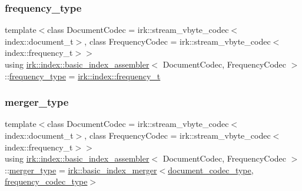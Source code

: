\mbox{\label{classirk_1_1index_1_1basic__index__assembler_a5e340ecba42926be7121502bdcaec26e}} 
\subsubsection{\texorpdfstring{frequency\+\_\+type}{frequency\_type}}
{\footnotesize\ttfamily template$<$class Document\+Codec  = irk\+::stream\+\_\+vbyte\+\_\+codec$<$index\+::document\+\_\+t$>$, class Frequency\+Codec  = irk\+::stream\+\_\+vbyte\+\_\+codec$<$index\+::frequency\+\_\+t$>$$>$ \\
using \mbox{\hyperlink{classirk_1_1index_1_1basic__index__assembler}{irk\+::index\+::basic\+\_\+index\+\_\+assembler}}$<$ Document\+Codec, Frequency\+Codec $>$\+::\mbox{\hyperlink{classirk_1_1index_1_1basic__index__assembler_a5e340ecba42926be7121502bdcaec26e}{frequency\+\_\+type}} =  \mbox{\hyperlink{namespaceirk_1_1index_aa2cb48e79abd95deb25bbdf36c0ea70f}{irk\+::index\+::frequency\+\_\+t}}}

\mbox{\label{classirk_1_1index_1_1basic__index__assembler_ade53519f2f70e2c1d66a2451a76259b0}} 
\subsubsection{\texorpdfstring{merger\+\_\+type}{merger\_type}}
{\footnotesize\ttfamily template$<$class Document\+Codec  = irk\+::stream\+\_\+vbyte\+\_\+codec$<$index\+::document\+\_\+t$>$, class Frequency\+Codec  = irk\+::stream\+\_\+vbyte\+\_\+codec$<$index\+::frequency\+\_\+t$>$$>$ \\
using \mbox{\hyperlink{classirk_1_1index_1_1basic__index__assembler}{irk\+::index\+::basic\+\_\+index\+\_\+assembler}}$<$ Document\+Codec, Frequency\+Codec $>$\+::\mbox{\hyperlink{classirk_1_1index_1_1basic__index__assembler_ade53519f2f70e2c1d66a2451a76259b0}{merger\+\_\+type}} =  \mbox{\hyperlink{classirk_1_1basic__index__merger}{irk\+::basic\+\_\+index\+\_\+merger}}$<$\mbox{\hyperlink{classirk_1_1index_1_1basic__index__assembler_ac64a6ddbef809f5c8b6eafffa9c8130d}{document\+\_\+codec\+\_\+type}}, \mbox{\hyperlink{classirk_1_1index_1_1basic__index__assembler_a2a415182287d7c48e7c6bf8d0c70a06f}{frequency\+\_\+codec\+\_\+type}}$>$}

